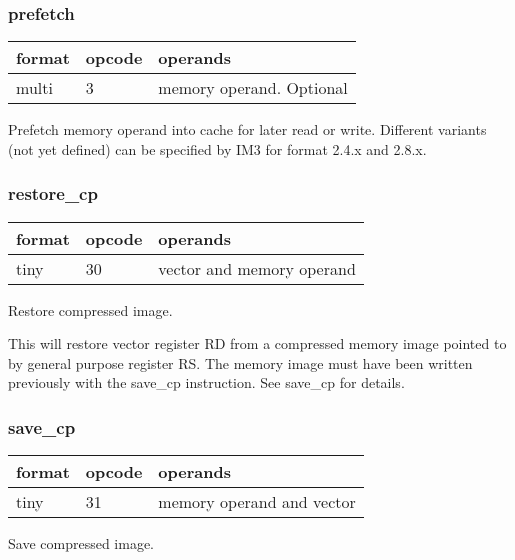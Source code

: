 \documentclass[forwardcom.tex]{subfiles}
\begin{document}
\subsubsection{prefetch}
\label{table:prefetchInstruction}
\begin{tabular}{|p{12mm}|p{12mm}|p{110mm}|}
\hline
\bfseries format & \bfseries opcode & \bfseries operands \\ \hline
multi & 3 & memory operand. Optional \\ \hline
\end{tabular}
\vspace{2mm}

Prefetch memory operand into cache for later read or write.
Different variants (not yet defined) can be specified by IM3 for format 2.4.x and 2.8.x.

\subsubsection{restore\_cp}
\label{table:restoreCpInstruction}
\begin{tabular}{|p{12mm}|p{12mm}|p{110mm}|}
\hline
\bfseries format & \bfseries opcode & \bfseries operands \\ \hline
tiny & 30 & vector and memory operand \\ \hline
\end{tabular}
\vspace{2mm}

Restore compressed image.
\vspace{2mm}

This will restore vector register RD from a compressed memory image pointed to by general purpose register RS.
The memory image must have been written previously with the save\_cp instruction. See save\_cp for details.

\subsubsection{save\_cp}
\label{table:saveCpInstruction}
\begin{tabular}{|p{12mm}|p{12mm}|p{110mm}|}
\hline
\bfseries format & \bfseries opcode & \bfseries operands \\ \hline
tiny & 31 & memory operand and vector \\ \hline
\end{tabular}
\vspace{2mm}

Save compressed image.
\vspace{2mm}
\end{document}
